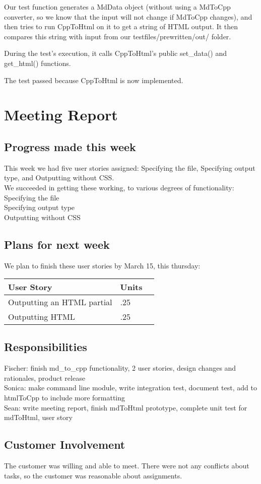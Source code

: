 \documentclass[12pt]{article}
\begin{document}
Our test function generates a MdData object (without using a MdToCpp converter, so we know that the input will not change if MdToCpp changes), and then tries to run CppToHtml on it to get a string of HTML output. It then compares this string with input from our testfiles/prewritten/out/  folder. 

During the test's execution, it calls CppToHtml's public set\_data() and get\_html() functions.

The test passed because CppToHtml is now implemented.
 \section{Meeting Report}

\subsection{Progress made this week}
This week we had five user stories assigned: Specifying the file, Specifying output type, and Outputting without CSS.\\
We succeeded in getting these working, to various degrees of functionality: \\
Specifying the file\\
Specifying output type\\
Outputting without CSS\\



\subsection{Plans for next week}
We plan to finish these user stories by March 15, this thursday:

 \begin{center}
    \begin{tabular}{ | l | l | p{5cm} |}
    \hline
    User Story & Units \\ \hline
    Outputting an HTML partial & .25 \\ \hline
    Outputting HTML & .25 \\ \hline
    \end{tabular}
\end{center}


\subsection{Responsibilities}
Fischer: finish md\_to\_cpp functionality, 2 user stories, design changes and rationales, product release  \\
Sonica: make command line module, write integration test, document test, add to htmlToCpp to include more formatting\\
Sean: write meeting report, finish mdToHtml prototype, complete unit test for mdToHtml, user story\\

\subsection{Customer Involvement}
The customer was willing and able to meet.
There were not any conflicts about tasks, so the customer was reasonable about assignments.

 
\end{document}
